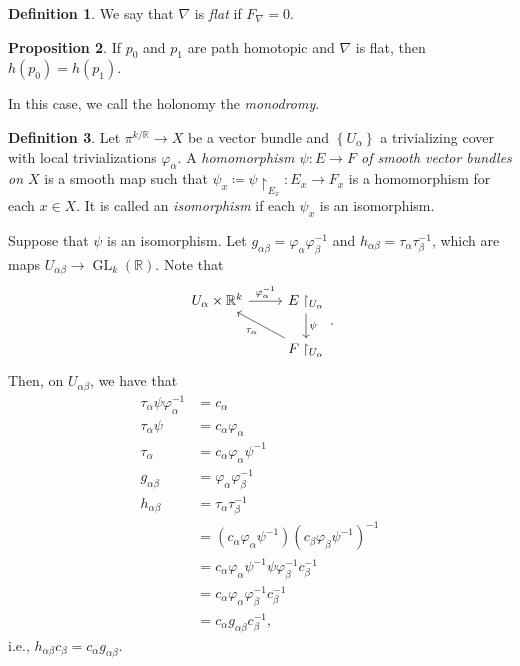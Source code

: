 \documentclass[10pt,letterpaper,cm]{nupset}
\theoremstyle{definition}
\newtheorem{definition}{Definition}[subsection]
\theoremstyle{theorem}
\newtheorem{prop}[definition]{Proposition}
\theoremstyle{remark}
\newcommand{\R}{\mathbb{R}}
\newcommand{\1}{\mathbb{1}}
\newcommand{\0}{\vec 0}
\DeclareMathOperator{\GL}{GL}
\begin{document}
\begin{definition}
We say that $\nabla$ is \textit{flat} if $F_{\nabla} =0$.
\end{definition}

\begin{prop}
If $p_0$ and $p_1$ are path homotopic and $\nabla$ is flat, then $h(p_0) = h(p_1)$. 
\end{prop}

In this case, we call the holonomy the \textit{monodromy}.

\begin{definition}
Let $\pi^{k/\R} \to X$ be a vector bundle and $\left\{U_{\alpha}\right\}$ a trivializing cover with local trivializations $\varphi_{\alpha}$. A \textit{homomorphism $\psi : E \to F$ of smooth vector bundles on $X$} is a smooth map such that $\psi_x \coloneqq \psi \restriction_{E_x} : E_x \to F_x$ is a homomorphism for each $x\in X$. It is called an \textit{isomorphism} if each $\psi_x$ is an isomorphism.  
\end{definition}

\smallskip

Suppose that $\psi$ is an isomorphism.  Let $g_{\alpha{\beta}} = \varphi_{\alpha}\varphi^{-1}_{\beta}$ and $h_{\alpha{\beta}} = \tau_{\alpha}\tau_{\beta}^{-1}$, which are maps $U_{\alpha{\beta}} \to \GL_k(\R)$. Note that 
\[
\begin{tikzcd}
U_{\alpha}\times \R^k \arrow[r, "\varphi_{\alpha}^{-1}"] & E\restriction_{U_{\alpha}} \arrow[d, "\psi"]             \\
                                                         & F \restriction_{U_{\alpha}}  \arrow[lu, "\tau_{\alpha}"]
\end{tikzcd}
.\]
 Then, on $U_{\alpha{\beta}}$, we have that 
\begin{align*}
\tau_{\alpha}\psi \varphi_{\alpha}^{-1} & = c_{\alpha}
\\ \tau_{\alpha}\psi &= c_{\alpha}\varphi_{\alpha}
\\ \tau_{\alpha} & = c_{\alpha}\varphi_{\alpha} \psi^{-1}
\\ g_{\alpha{\beta}} & = \varphi_{\alpha} \varphi_{\beta}^{-1}
\\  h_{\alpha{\beta}} & = \tau_{\alpha}\tau_{\beta}^{-1}
\\ & = \left(c_{\alpha} \varphi_{\alpha}\psi^{-1}\right)\left(c_{\beta}\varphi_{\beta}\psi^{-1}\right)^{-1}
\\ & = c_{\alpha}\varphi_{\alpha}\psi^{-1}\psi \varphi_{\beta}^{-1} c_{\beta}^{-1}
\\ & = c_{\alpha}\varphi_{\alpha} \varphi_{\beta}^{-1}c_{\beta}^{-1}
\\ & = c_{\alpha}g_{\alpha{\beta}}c_{\beta}^{-1}\text{,}
\end{align*}
i.e., $h_{\alpha{\beta}}c_{\beta} = c_{\alpha}g_{\alpha{\beta}}$.
\end{document}
